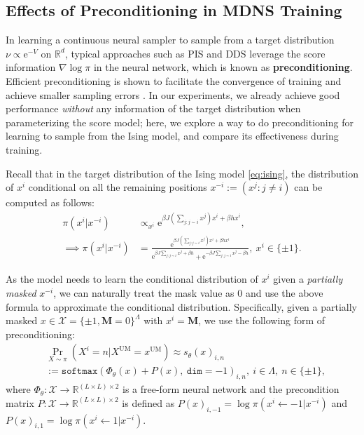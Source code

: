 \documentclass{article}
\theoremstyle{remark}
\newcommand{\ro}[1]{\left(#1\right)} %
\newcommand{\e}{\mathrm{e}}
\newcommand{\R}{\mathbb{R}}
\newcommand{\cX}{\mathcal{X}}
\newcommand{\um}{\mathrm{UM}} %
\newcommand{\mask}{\mathbf{M}}
\begin{document}
\subsection{Effects of Preconditioning in MDNS Training}
\label{app:exp_ising_precond}
In learning a continuous neural sampler to sample from a target distribution $\nu\propto\e^{-V}$ on $\R^d$, typical approaches such as PIS \cite{zhang2022path} and DDS \cite{vargas2023denoising} leverage the score information $\nabla\log\pi$ in the neural network, which is known as \textbf{preconditioning}. Efficient preconditioning is shown to facilitate the convergence of training and achieve smaller sampling errors \cite{he2025no}. In our experiments, we already achieve good performance \textit{without} any information of the target distribution when parameterizing the score model; here, we explore a way to do preconditioning for learning to sample from the Ising model, and compare its effectiveness during training.

Recall that in the target distribution of the Ising model \cref{eq:ising}, the distribution of $x^i$ conditional on all the remaining positions $x^{-i}:=(x^j:j\ne i)$ can be computed as follows:
\begin{align*}
    \pi(x^i|x^{-i})&\propto_{x^i}\e^{\beta J\ro{\sum_{j:j\sim i}x^j}x^i+\beta hx^i},\\
    \implies \pi(x^i|x^{-i})&=\frac{\e^{\beta J\ro{\sum_{j:j\sim i}x^j}x^i+\beta hx^i}}{\e^{\beta J\sum_{j:j\sim i}x^j+\beta h}+\e^{-\beta J\sum_{j:j\sim i}x^j-\beta h}},~x^i\in\{\pm1\}.
\end{align*}

As the model needs to learn the conditional distribution of $x^i$ given a \textit{partially masked} $x^{-i}$, we can naturally treat the mask value as $0$ and use the above formula to approximate the conditional distribution. Specifically, given a partially masked $x\in\cX=\{\pm1,\mask=0\}^\Lambda$ with $x^i=\mask$, we use the following form of preconditioning:
\begin{align*}
&\Pr_{X\sim\pi}(X^i=n|X^\um=x^\um)\approx s_\theta(x)_{i,n}\\
&:=\mathtt{softmax}(\Phi_\theta(x)+P(x),~\mathtt{dim}=-1)_{i,n},~i\in\Lambda,~n\in\{\pm1\},
\end{align*}
where $\Phi_\theta:\cX\to\R^{(L\times L)\times 2}$ is a free-form neural network and the precondition matrix $P:\cX\to\R^{(L\times L)\times 2}$ is defined as $P(x)_{i,-1}=\log\pi(x^i\gets-1|x^{-i})$ and $P(x)_{i,1}=\log\pi(x^i\gets1|x^{-i})$. 
\end{document}
